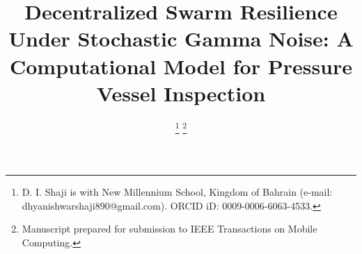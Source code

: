\documentclass[journal]{IEEEtran}
\begin{document}
\title{Decentralized Swarm Resilience Under Stochastic Gamma Noise: A Computational Model for Pressure Vessel Inspection}

\author{
\thanks{D. I. Shaji is with New Millennium School, Kingdom of Bahrain (e-mail: dhyanishwarshaji890@gmail.com). ORCID iD: 0009-0006-6063-4533.}
\thanks{Manuscript prepared for submission to IEEE Transactions on Mobile Computing.}
}

\maketitle
\end{document}
